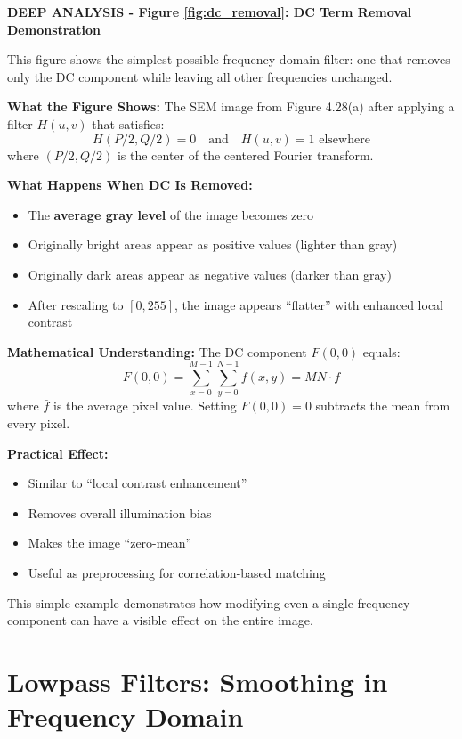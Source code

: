 \documentclass[12pt,a4paper]{article}
\begin{document}
\begin{deepexplanation}
\textbf{DEEP ANALYSIS - Figure \ref{fig:dc_removal}: DC Term Removal Demonstration}

This figure shows the simplest possible frequency domain filter: one that removes only the DC component while leaving all other frequencies unchanged.

\textbf{What the Figure Shows:}
The SEM image from Figure 4.28(a) after applying a filter $H(u,v)$ that satisfies:
\[
H(P/2, Q/2) = 0 \quad \text{and} \quad H(u,v) = 1 \text{ elsewhere}
\]
where $(P/2, Q/2)$ is the center of the centered Fourier transform.

\textbf{What Happens When DC Is Removed:}
\begin{itemize}
    \item The \textbf{average gray level} of the image becomes zero
    \item Originally bright areas appear as positive values (lighter than gray)
    \item Originally dark areas appear as negative values (darker than gray)
    \item After rescaling to $[0, 255]$, the image appears ``flatter'' with enhanced local contrast
\end{itemize}

\textbf{Mathematical Understanding:}
The DC component $F(0,0)$ equals:
\[
F(0,0) = \sum_{x=0}^{M-1} \sum_{y=0}^{N-1} f(x,y) = MN \cdot \bar{f}
\]
where $\bar{f}$ is the average pixel value. Setting $F(0,0) = 0$ subtracts the mean from every pixel.

\textbf{Practical Effect:}
\begin{itemize}
    \item Similar to ``local contrast enhancement''
    \item Removes overall illumination bias
    \item Makes the image ``zero-mean''
    \item Useful as preprocessing for correlation-based matching
\end{itemize}

This simple example demonstrates how modifying even a single frequency component can have a visible effect on the entire image.
\end{deepexplanation}


\section{Lowpass Filters: Smoothing in Frequency Domain}
\end{document}
